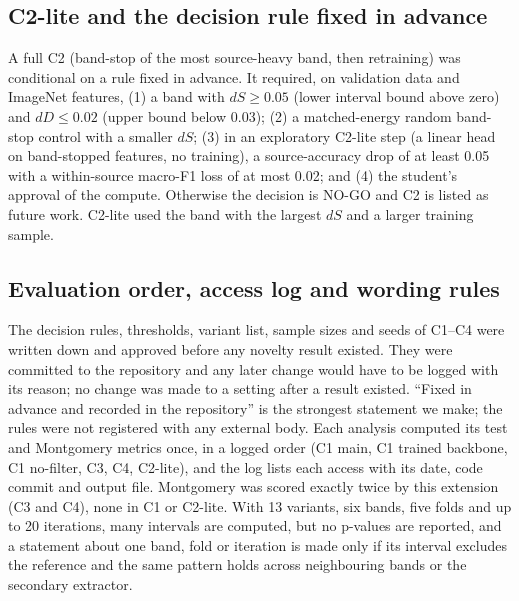 \subsection{C2-lite and the decision rule fixed in advance}
\label{sec:meth-c2}
A full C2 (band-stop of the most source-heavy band, then retraining) was conditional on a rule fixed in advance. It required, on validation data and ImageNet features, (1) a band with $dS\ge 0.05$ (lower interval bound above zero) and $dD\le0.02$ (upper bound below 0.03); (2) a matched-energy random band-stop control with a smaller $dS$; (3) in an exploratory C2-lite step (a linear head on band-stopped features, no training), a source-accuracy drop of at least 0.05 with a within-source macro-F1 loss of at most 0.02; and (4) the student's approval of the compute. Otherwise the decision is NO-GO and C2 is listed as future work. C2-lite used the band with the largest $dS$ and a larger training sample.

\subsection{Evaluation order, access log and wording rules}
\label{sec:eval-order}
The decision rules, thresholds, variant list, sample sizes and seeds of C1--C4 were written down and approved before any novelty result existed. They were committed to the repository and any later change would have to be logged with its reason; no change was made to a setting after a result existed. ``Fixed in advance and recorded in the repository'' is the strongest statement we make; the rules were not registered with any external body. Each analysis computed its test and Montgomery metrics once, in a logged order (C1 main, C1 trained backbone, C1 no-filter, C3, C4, C2-lite), and the log lists each access with its date, code commit and output file. Montgomery was scored exactly twice by this extension (C3 and C4), none in C1 or C2-lite. With 13 variants, six bands, five folds and up to 20 iterations, many intervals are computed, but no p-values are reported, and a statement about one band, fold or iteration is made only if its interval excludes the reference and the same pattern holds across neighbouring bands or the secondary extractor.

